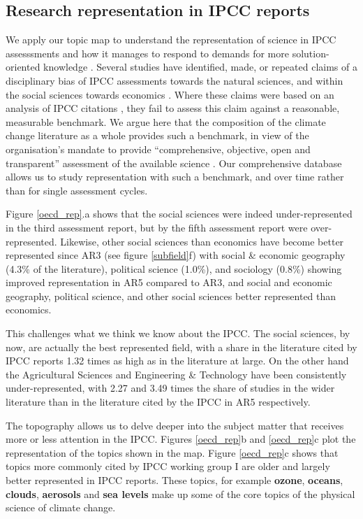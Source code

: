 \documentclass{article}
\begin{document}
\begin{linenumbers}
		
		\subsection*{Research representation in IPCC reports}
		We apply our topic map to understand the representation of science in IPCC assesssments and how it manages to respond to demands for more solution-oriented knowledge \cite{Kowarsch2017}. Several studies have identified, made, or repeated claims of a disciplinary bias of IPCC assessments towards the natural sciences, and within the social sciences towards economics \cite{Bjurström2011, Victor2015, Hulme2010, Corbera2016}. Where these claims were based on an analysis of IPCC citations \cite{Bjurström2011}, they fail to assess this claim against a reasonable, measurable benchmark. We argue here that the composition of the climate change literature as a whole provides such a benchmark, in view of the organisation's mandate to provide ``comprehensive, objective, open and transparent'' assessment of the available science \cite{IPCC2013}. Our comprehensive database allows us to study representation with such a benchmark, and over time rather than for single assessment cycles.
		
		Figure \ref{oecd_rep}.a shows that the social sciences were indeed under-represented in the third assessment report, but by the fifth assessment report were over-represented. Likewise, other social sciences than economics have become better represented since AR3  (see figure \ref{subfield}f) with social \& economic geography (4.3\% of the literature), political science (1.0\%), and sociology (0.8\%) showing improved representation in AR5 compared to AR3, and social and economic geography, political science, and other social sciences better represented than economics. 
		
		This challenges what we think we know about the IPCC. The social sciences, by now, are actually the best represented field, with a share in the literature cited by IPCC reports 1.32 times as high as in the literature at large.  On the other hand the Agricultural Sciences and Engineering \& Technology have been consistently under-represented, with 2.27 and 3.49 times the share of studies in the wider literature than in the literature cited by the IPCC in AR5 respectively. 
		
		
		The topography allows us to delve deeper into the subject matter that receives more or less attention in the IPCC. Figures \ref{oecd_rep}b and \ref{oecd_rep}c plot the representation of the topics shown in the map. Figure \ref{oecd_rep}c shows that topics more commonly cited by IPCC working group I are older and largely better represented in IPCC reports. These topics, for example \textbf{ozone}, \textbf{oceans}, \textbf{clouds}, \textbf{aerosols} and \textbf{sea levels} make up some of the core topics of the physical science of climate change.
		

\end{linenumbers}
\end{document}
